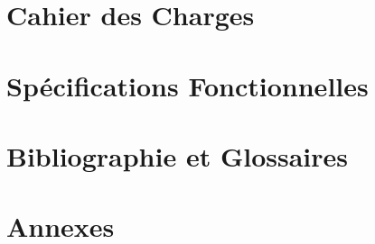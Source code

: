 \documentclass[a4paper, french]{report}
\begin{document}
\newpage




\part{Cahier des Charges}


\part{Spécifications Fonctionnelles}


\part{Bibliographie et Glossaires}


\part{Annexes}

\end{document}
